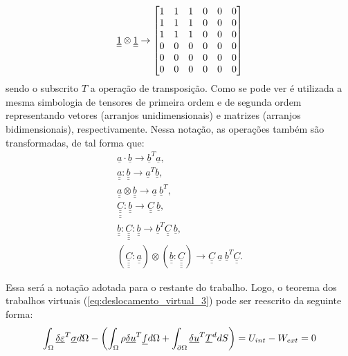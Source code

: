 \begin{equation}
	\label{eq:UmllotimesUll}
	\underline{\underline 1} \otimes \underline{\underline 1} \rightarrow  
	\begin{bmatrix}
		1 & 1 & 1 & 0 & 0 & 0 \\
		1 & 1 & 1 & 0 & 0 & 0  \\
		1 & 1 & 1 & 0 & 0 & 0  \\
		0 & 0 & 0 & 0 & 0 & 0  \\
		0 & 0 & 0 & 0 & 0 & 0  \\
		0 & 0 & 0 & 0 & 0 & 0 
	\end{bmatrix}
\end{equation}
sendo o subscrito $T$ a operação de transposição. Como se pode ver é utilizada a mesma simbologia de tensores de primeira ordem e de segunda ordem representando vetores (arranjos unidimensionais) e matrizes (arranjos bidimensionais), respectivamente. Nessa notação, as operações também são transformadas, de tal forma que:
\begin{equation}
	\label{eq:operacoes_voigt}
	\begin{array}{lcl}
		\underline{a} \cdot \underline{b} \rightarrow \underline{b}^T \underline{a}, \\ 
		\underline{\underline{a}} : \underline{\underline{b}} \rightarrow \underline{a}^T \underline{b}, \\ 
		\underline{\underline a} \otimes \underline{\underline b} \rightarrow \underline a ~ \underline b ^T, \\ 
		\underline{\underline{\underline{\underline{C}}}} : \underline{\underline{b}} \rightarrow \underline{\underline C} ~ \underline b, \\ 
		\underline{\underline{b}}:\underline{\underline{\underline{\underline{C}}}} : \underline{\underline{b}} \rightarrow \underline {b}^T \underline{\underline{C}} ~ \underline{b}, \\ 
		\left( 	\underline{\underline{\underline{\underline{C}}}}:\underline{\underline{a}} \right) \otimes \left( \underline{\underline{b}} :	\underline{\underline{\underline{\underline{C}}}} \right) \rightarrow \underline{\underline{C}}~ \underline{a}~\underline{b}^T \underline{\underline{C}}.
	\end{array}
\end{equation}

Essa será a notação adotada para o restante do trabalho. Logo, o teorema dos trabalhos virtuais (\ref{eq:deslocamento_virtual_3}) pode ser reescrito da seguinte forma:
\begin{equation}
	\label{eq:deslocamento_virtual_3}
	\int_{\Omega} \underline{\delta \varepsilon}^T \underline \sigma d\Omega - \left(\int_{\Omega} \rho \underline {\delta u}^T \underline f d\Omega + \int_{\partial \Omega} \underline {\delta u}^T \underline T^d dS \right) = U_{int} - W_{ext} = 0
\end{equation}
